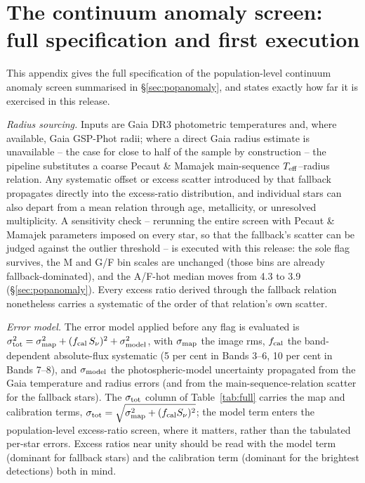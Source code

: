 \documentclass{openjournal}
\begin{document}
\section{The continuum anomaly screen: full specification and first execution}
\label{app:continuum}

This appendix gives the full specification of the population-level
continuum anomaly screen summarised in \S\ref{sec:popanomaly}, and
states exactly how far it is exercised in this release.

\emph{Radius sourcing.} Inputs are Gaia DR3 photometric temperatures
and, where available, Gaia GSP-Phot radii; where a direct Gaia radius
estimate is unavailable -- the case for close to half of the sample by
construction -- the pipeline substitutes a coarse Pecaut \& Mamajek
main-sequence $T_{\rm eff}$--radius relation. Any systematic offset or
excess scatter introduced by that fallback propagates directly into the
excess-ratio distribution, and individual stars can also depart from a
mean relation through age, metallicity, or unresolved multiplicity.
A sensitivity check -- rerunning the entire screen with Pecaut \&
Mamajek parameters imposed on every star, so that the fallback's
scatter can be judged against the outlier threshold -- is executed
with this release: the sole flag survives, the M and G/F bin scales
are unchanged (those bins are already fallback-dominated), and the
A/F-hot median moves from 4.3 to 3.9 (\S\ref{sec:popanomaly}). Every
excess ratio derived through the fallback relation nonetheless carries
a systematic of the order of that relation's own scatter.

\emph{Error model.} The error model applied before any flag is
evaluated is
$\sigma_{\rm tot}^{2} = \sigma_{\rm map}^{2} +
(f_{\rm cal}\,S_\nu)^{2} + \sigma_{\rm model}^{2}$, with
$\sigma_{\rm map}$ the image rms, $f_{\rm cal}$ the band-dependent
absolute-flux systematic (5 per cent in Bands 3--6, 10 per cent in
Bands 7--8), and $\sigma_{\rm model}$ the photospheric-model
uncertainty propagated from the Gaia temperature and radius errors
(and from the main-sequence-relation scatter for the fallback stars).
The $\sigma_{\rm tot}$ column of Table~\ref{tab:full} carries the map
and calibration terms,
$\sigma_{\rm tot} = \sqrt{\sigma_{\rm map}^{2} + (f_{\rm cal} S_\nu)^{2}}$;
the model term enters the population-level excess-ratio screen, where
it matters, rather than the tabulated per-star errors. Excess ratios
near unity should be read with the model term (dominant for fallback
stars) and the calibration term (dominant for the brightest detections)
both in mind.
\end{document}
